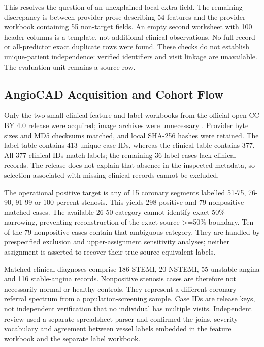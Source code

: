 \documentclass[conference]{IEEEtran}
\begin{document}
This resolves the question of an unexplained local extra field. The remaining discrepancy is between provider prose describing 54 features and the provider workbook containing 55 non-target fields. An empty second worksheet with 100 header columns is a template, not additional clinical observations. No full-record or all-predictor exact duplicate rows were found. These checks do not establish unique-patient independence: verified identifiers and visit linkage are unavailable. The evaluation unit remains a source row.

\subsection{AngioCAD Acquisition and Cohort Flow}
Only the two small clinical-feature and label workbooks from the official open CC BY 4.0 release were acquired; image archives were unnecessary \cite{r4}. Provider byte sizes and MD5 checksums matched, and local SHA-256 hashes were retained. The label table contains 413 unique case IDs, whereas the clinical table contains 377. All 377 clinical IDs match labels; the remaining 36 label cases lack clinical records. The release does not explain that absence in the inspected metadata, so selection associated with missing clinical records cannot be excluded.

The operational positive target is any of 15 coronary segments labelled 51-75, 76-90, 91-99 or 100 percent stenosis. This yields 298 positive and 79 nonpositive matched cases. The available 26-50 category cannot identify exact 50\% narrowing, preventing reconstruction of the exact source >=50\% boundary. Ten of the 79 nonpositive cases contain that ambiguous category. They are handled by prespecified exclusion and upper-assignment sensitivity analyses; neither assignment is asserted to recover their true source-equivalent labels.

Matched clinical diagnoses comprise 186 STEMI, 20 NSTEMI, 55 unstable-angina and 116 stable-angina records. Nonpositive stenosis cases are therefore not necessarily normal or healthy controls. They represent a different coronary-referral spectrum from a population-screening sample. Case IDs are release keys, not independent verification that no individual has multiple visits. Independent review used a separate spreadsheet parser and confirmed the joins, severity vocabulary and agreement between vessel labels embedded in the feature workbook and the separate label workbook.
\end{document}
